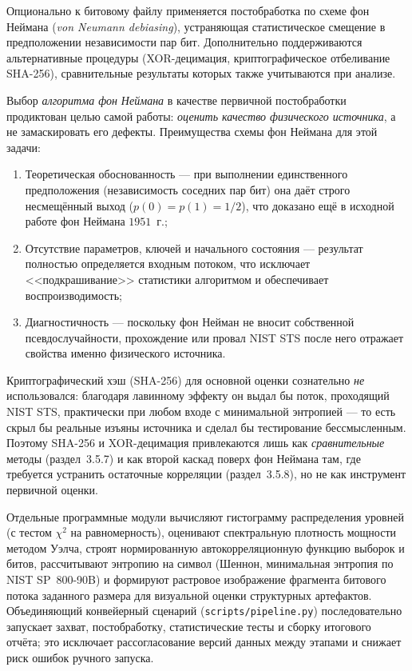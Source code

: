 Опционально к битовому файлу применяется постобработка по схеме фон Неймана
(\textit{von Neumann debiasing}), устраняющая статистическое смещение в
предположении независимости пар бит. Дополнительно поддерживаются альтернативные
процедуры (XOR-децимация, криптографическое отбеливание SHA-256), сравнительные
результаты которых также учитываются при анализе.

Выбор \textit {алгоритма фон Неймана} в качестве первичной постобработки продиктован
целью самой работы: \emph{оценить качество физического источника}, а не
замаскировать его дефекты. Преимущества схемы фон Неймана для этой задачи:
\begin{enumerate}
\item Теоретическая обоснованность --- при выполнении единственного предположения
  (независимость соседних пар бит) она даёт строго несмещённый выход
  ($p(0)=p(1)=1/2$), что доказано ещё в исходной работе фон Неймана $1951$~г.;
\item Отсутствие параметров, ключей и начального состояния --- результат полностью
  определяется входным потоком, что исключает <<подкрашивание>> статистики
  алгоритмом и обеспечивает воспроизводимость;
\item Диагностичность --- поскольку фон Нейман не вносит собственной
  псевдослучайности, прохождение или провал NIST STS после него отражает свойства
  именно физического источника.
\end{enumerate}
Криптографический хэш (SHA-256) для основной оценки сознательно \emph{не}
использовался: благодаря лавинному эффекту он выдал бы поток, проходящий NIST STS,
практически при любом входе с минимальной энтропией --- то есть скрыл бы реальные
изъяны источника и сделал бы тестирование бессмысленным. Поэтому SHA-256 и
XOR-децимация привлекаются лишь как \emph{сравнительные} методы (раздел~3.5.7) и
как второй каскад поверх фон Неймана там, где требуется устранить остаточные
корреляции (раздел~3.5.8), но не как инструмент первичной оценки.

Отдельные программные модули вычисляют гистограмму распределения уровней (с тестом
$\chi^2$ на равномерность), оценивают спектральную плотность мощности методом Уэлча,
строят нормированную автокорреляционную функцию выборок и битов, рассчитывают
энтропию на символ (Шеннон, минимальная энтропия по NIST SP~800-90B) и формируют
растровое изображение фрагмента битового потока заданного размера для визуальной оценки
структурных артефактов. Объединяющий конвейерный сценарий (\texttt{scripts/pipeline.py})
последовательно запускает захват, постобработку, статистические тесты и сборку
итогового отчёта; это исключает рассогласование версий данных между этапами и
снижает риск ошибок ручного запуска.

